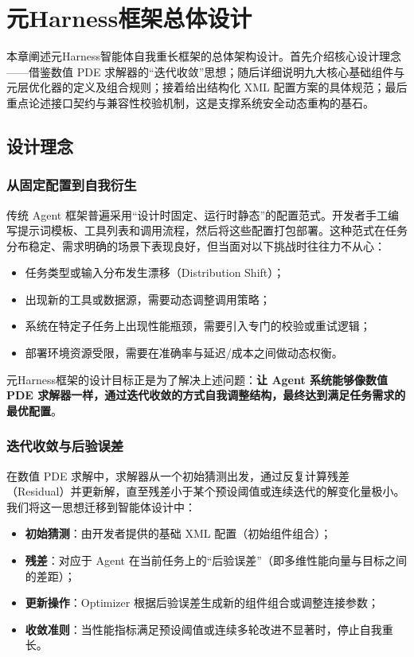 \chapter{元Harness框架总体设计}

本章阐述元Harness智能体自我重长框架的总体架构设计。首先介绍核心设计理念——借鉴数值 PDE 求解器的“迭代收敛”思想；随后详细说明九大核心基础组件与元层优化器的定义及组合规则；接着给出结构化 XML 配置方案的具体规范；最后重点论述接口契约与兼容性校验机制，这是支撑系统安全动态重构的基石。

\section{设计理念}

\subsection{从固定配置到自我衍生}

传统 Agent 框架普遍采用“设计时固定、运行时静态”的配置范式。开发者手工编写提示词模板、工具列表和调用流程，然后将这些配置打包部署。这种范式在任务分布稳定、需求明确的场景下表现良好，但当面对以下挑战时往往力不从心：
\begin{itemize}
    \item 任务类型或输入分布发生漂移（Distribution Shift）；
    \item 出现新的工具或数据源，需要动态调整调用策略；
    \item 系统在特定子任务上出现性能瓶颈，需要引入专门的校验或重试逻辑；
    \item 部署环境资源受限，需要在准确率与延迟/成本之间做动态权衡。
\end{itemize}

元Harness框架的设计目标正是为了解决上述问题：\textbf{让 Agent 系统能够像数值 PDE 求解器一样，通过迭代收敛的方式自我调整结构，最终达到满足任务需求的最优配置}。

\subsection{迭代收敛与后验误差}

在数值 PDE 求解中，求解器从一个初始猜测出发，通过反复计算残差（Residual）并更新解，直至残差小于某个预设阈值或连续迭代的解变化量极小。我们将这一思想迁移到智能体设计中：
\begin{itemize}
    \item \textbf{初始猜测}：由开发者提供的基础 XML 配置（初始组件组合）；
    \item \textbf{残差}：对应于 Agent 在当前任务上的“后验误差”（即多维性能向量与目标之间的差距）；
    \item \textbf{更新操作}：Optimizer 根据后验误差生成新的组件组合或调整连接参数；
    \item \textbf{收敛准则}：当性能指标满足预设阈值或连续多轮改进不显著时，停止自我重长。
\end{itemize}

